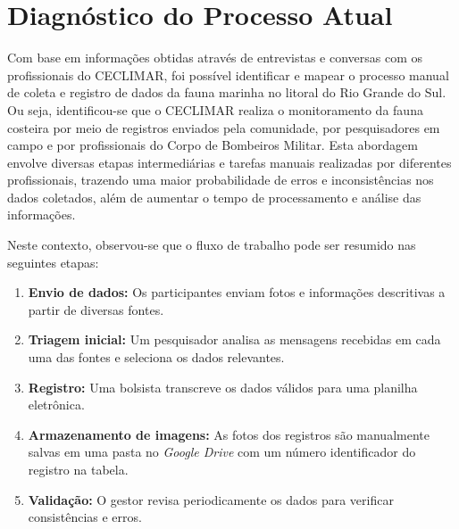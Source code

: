 \section{Diagnóstico do Processo Atual} \label{chapter:diagnostico}

Com base em informações obtidas através de entrevistas e conversas com os profissionais do CECLIMAR, foi possível identificar e mapear o processo manual de coleta e registro de dados da fauna marinha no litoral do Rio Grande do Sul.
Ou seja, identificou-se que o CECLIMAR realiza o monitoramento da fauna costeira por meio de registros enviados pela comunidade, por pesquisadores em campo e por profissionais do Corpo de Bombeiros Militar. 
Esta abordagem envolve diversas etapas intermediárias e tarefas manuais realizadas por diferentes profissionais, trazendo uma maior probabilidade de erros e inconsistências nos dados coletados, além de aumentar o tempo de processamento e análise das informações.


Neste contexto, observou-se que o fluxo de trabalho pode ser resumido nas seguintes etapas:

\begin{enumerate}
    \item \textbf{Envio de dados:} Os participantes enviam fotos e informações descritivas a partir de diversas fontes.
    \item \textbf{Triagem inicial:} Um pesquisador analisa as mensagens recebidas em cada uma das fontes e seleciona os dados relevantes.
    \item \textbf{Registro:} Uma bolsista transcreve os dados válidos para uma planilha eletrônica.
    \item \textbf{Armazenamento de imagens:} As fotos dos registros são manualmente salvas em uma pasta no \textit{Google Drive} com um número identificador do registro na tabela.
    \item \textbf{Validação:} O gestor revisa periodicamente os dados para verificar consistências e erros.
\end{enumerate}

